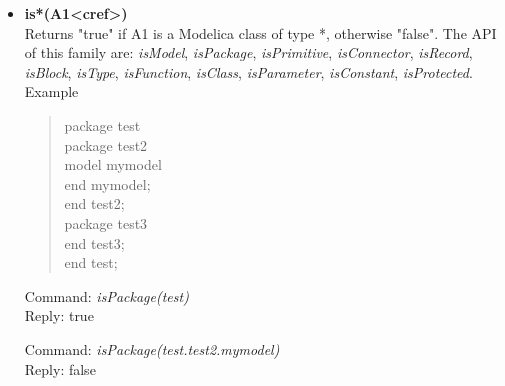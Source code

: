 \documentclass[11pt,a4paper,oneside,english]{book}
\newenvironment{modelicaExamples}{\begin{itemize}}{\end{itemize}}
\newcommand{\api}[2]{\item \textbf{#1} \\ #2}
\newcommand{\tab}{\hspace{2em}}
\newcommand{\command}[1]{Command: \textit{#1}\\}
\newcommand{\reply}[1]{Reply: #1}
\newcommand{\functionex}[2]{\begin{singlespace} \command{#1} \reply{#2} \end{singlespace}}
\newcommand{\examples}{Example}
\newenvironment{mocode}{\begin{verse}\begin{singlespace}\begin{scriptsize}\ttfamily}{\end{scriptsize}\end{singlespace}\end{verse}}
\begin{document}
\begin{modelicaExamples}
		\api{is*(A1<cref>)}{Returns "true" if A1 is a Modelica class of type *, otherwise "false". The API of this family are: \textit{isModel}, \textit{isPackage}, \textit{isPrimitive}, \textit{isConnector}, \textit{isRecord}, \textit{isBlock}, \textit{isType}, \textit{isFunction}, \textit{isClass}, \textit{isParameter}, \textit{isConstant}, \textit{isProtected}. \\ \examples
			\begin{mocode}
				package test\\
				\tab package test2\\
				\tab\tab model mymodel\\
				\tab\tab end mymodel;\\
				\tab end test2;\\
				\tab package test3\\
				\tab end test3;\\
				end test;\\ 
			\end{mocode} 
			\functionex{isPackage(test)}
			{true}
			\functionex{isPackage(test.test2.mymodel)}
			{false}
		}
		

\end{modelicaExamples}
\end{document}
